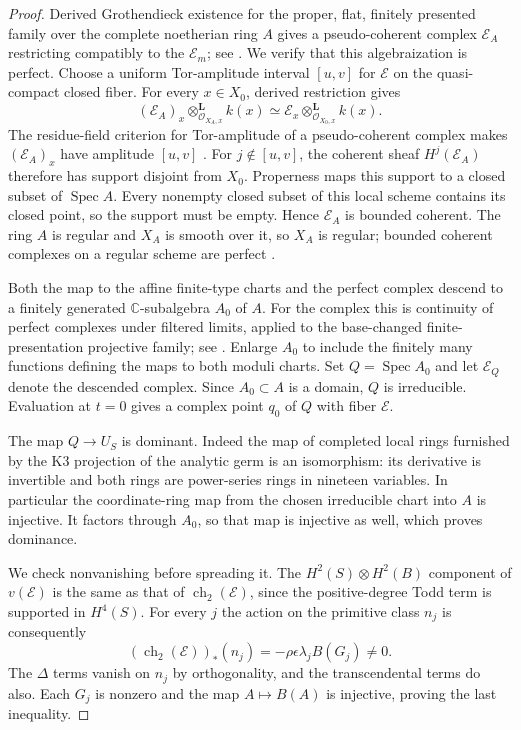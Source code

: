 \documentclass[11pt]{article}
\numberwithin{equation}{section}
\theoremstyle{definition}
\theoremstyle{remark}
\newcommand{\C}{\mathbb C}
\newcommand{\ch}{\operatorname{ch}}
\newcommand{\Spec}{\operatorname{Spec}}
\begin{document}
\begin{proof}
Derived Grothendieck existence for the proper, flat, finitely
presented family over the complete noetherian ring $A$ gives a
pseudo-coherent complex $\mathcal E_A$ restricting compatibly to
the $\mathcal E_m$; see \cite[Tag~0DIG]{Deformation:Stacks}.
We verify that this algebraization is perfect. Choose a uniform
Tor-amplitude interval $[u,v]$ for $\mathcal E$ on the quasi-compact
closed fiber. For every $x\in X_0$, derived restriction gives
\[
 (\mathcal E_A)_x\otimes^{\mathbf L}_{\mathcal O_{X_A,x}}k(x)
 \simeq
 \mathcal E_x\otimes^{\mathbf L}_{\mathcal O_{X_0,x}}k(x).
\]
The residue-field criterion for Tor-amplitude of a pseudo-coherent
complex makes $(\mathcal E_A)_x$ have amplitude $[u,v]$
\cite[Tag~068V]{Deformation:Stacks}. For $j\notin[u,v]$, the
coherent sheaf $H^j(\mathcal E_A)$ therefore has support disjoint
from $X_0$. Properness maps this support to a closed subset of
$\Spec A$. Every nonempty closed subset of this local scheme
contains its closed point, so the support must be empty. Hence
$\mathcal E_A$ is bounded coherent. The ring $A$ is regular and
$X_A$ is smooth over it, so $X_A$ is regular; bounded coherent
complexes on a regular scheme are perfect
\cite[Tags~036D and 0FDC]{Deformation:Stacks}.

Both the map to the affine finite-type charts and the perfect
complex descend to a finitely generated $\C$-subalgebra $A_0$ of
$A$. For the complex this is continuity of perfect complexes under
filtered limits, applied to the base-changed finite-presentation
projective family; see \cite[Tag~09RF]{Deformation:Stacks}.
Enlarge $A_0$ to include the finitely many functions defining the
maps to both moduli charts. Set $Q=\Spec A_0$ and let
$\mathcal E_Q$ denote the descended complex. Since $A_0\subset A$
is a domain, $Q$ is irreducible. Evaluation at $t=0$ gives a complex
point $q_0$ of $Q$ with fiber $\mathcal E$.

The map $Q\to U_S$ is dominant. Indeed the map of completed local
rings furnished by the K3 projection of the analytic germ is an
isomorphism: its derivative is invertible and both rings are
power-series rings in nineteen variables. In particular the
coordinate-ring map from the chosen irreducible chart into $A$
is injective. It factors through $A_0$, so that map is injective
as well, which proves dominance.

We check nonvanishing before spreading it. The $H^2(S)\otimes
H^2(B)$ component of $v(\mathcal E)$ is the same as that of
$\ch_2(\mathcal E)$, since the positive-degree Todd term is
supported in $H^4(S)$. For every $j$ the action on the primitive
class $n_j$ is consequently
\begin{equation}\label{eq:initial-cycle-nonzero}
 (\ch_2(\mathcal E))_*(n_j)
       =-\rho\epsilon\lambda_j B(G_j)\ne0.
\end{equation}
The $\Delta$ terms vanish on $n_j$ by orthogonality, and the
transcendental terms do also. Each $G_j$ is nonzero and the map
$A\mapsto B(A)$ is injective, proving the last inequality.


\end{proof}
\end{document}
